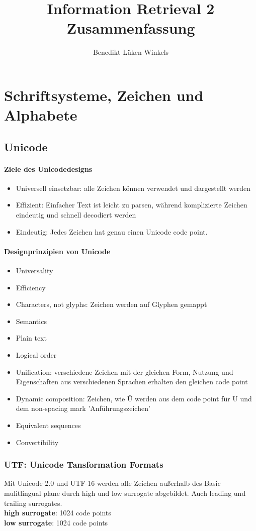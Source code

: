 \documentclass{article}
\title{Information Retrieval 2 \\Zusammenfassung}
\author{Benedikt Lüken-Winkels}
\begin{document}
\maketitle
\tableofcontents
\newpage

\section{Schriftsysteme, Zeichen und Alphabete}
\subsection{Unicode}
\paragraph{Ziele des Unicodedesigns}
\begin{itemize}
\item Universell einsetzbar: alle Zeichen können verwendet und dargestellt werden 
\item Effizient: Einfacher Text ist leicht zu parsen, während komplizierte Zeichen eindeutig und schnell decodiert werden
\item Eindeutig: Jedes Zeichen hat genau einen Unicode code point.
\end{itemize}
\paragraph{Designprinzipien von Unicode}
\begin{itemize}
\item Universality 
\item Efficiency
\item Characters, not glyphs: Zeichen werden auf Glyphen gemappt
\item Semantics
\item Plain text
\item Logical order
\item Unification: verschiedene Zeichen mit der gleichen Form, Nutzung und Eigenschaften aus verschiedenen Sprachen erhalten den gleichen code point
\item Dynamic composition: Zeichen, wie Ü werden aus dem code point für U und dem non-spacing mark 'Anführungszeichen' 
\item Equivalent sequences
\item Convertibility

\end{itemize}

\subsubsection{UTF: Unicode Tansformation Formats}
Mit Unicode 2.0 und UTF-16 werden alle Zeichen außerhalb des Basic mulitlingual plane durch high und low surrogate abgebildet. Auch leading und trailing surrogates.  \\
\textbf{high surrogate}: 1024 code points  \\
\textbf{low surrogate}:  1024 code points
\end{document}

